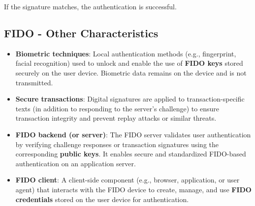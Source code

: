 If the signature matches, the authentication is successful.

\subsection*{FIDO - Other Characteristics}
\begin{itemize}
    \item \textbf{Biometric techniques}: Local authentication methods (e.g., fingerprint, facial recognition) used to unlock and enable the use of \textbf{FIDO keys} stored securely on the user device. Biometric data remains on the device and is not transmitted.
    
    \item \textbf{Secure transactions}: Digital signatures are applied to transaction-specific texts (in addition to responding to the server's challenge) to ensure transaction integrity and prevent replay attacks or similar threats.
    
    \item \textbf{FIDO backend (or server)}: The FIDO server validates user authentication by verifying challenge responses or transaction signatures using the corresponding \textbf{public keys}. It enables secure and standardized FIDO-based authentication on an application server.
    
    \item \textbf{FIDO client}: A client-side component (e.g., browser, application, or user agent) that interacts with the FIDO device to create, manage, and use \textbf{FIDO credentials} stored on the user device for authentication.
\end{itemize}

